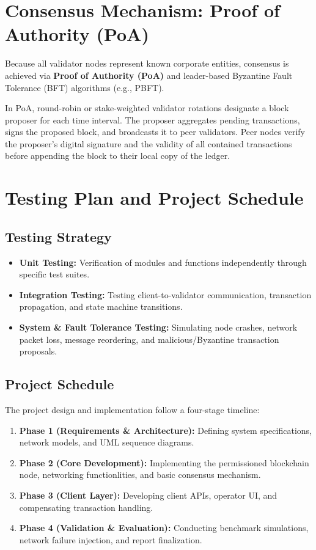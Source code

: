 \documentclass[11pt, a4paper, oneside]{memoir}
\begin{document}
\section{Consensus Mechanism: Proof of Authority (PoA)}
Because all validator nodes represent known corporate entities, consensus is achieved via \textbf{Proof of Authority (PoA)} and leader-based Byzantine Fault Tolerance (BFT) algorithms (e.g., PBFT). 

In PoA, round-robin or stake-weighted validator rotations designate a block proposer for each time interval. The proposer aggregates pending transactions, signs the proposed block, and broadcasts it to peer validators. Peer nodes verify the proposer's digital signature and the validity of all contained transactions before appending the block to their local copy of the ledger.

\section{Testing Plan and Project Schedule}
\subsection{Testing Strategy}
\begin{itemize}
    \item \textbf{Unit Testing:} Verification of modules and functions independently through specific test suites. 
    \item \textbf{Integration Testing:} Testing client-to-validator communication, transaction propagation, and state machine transitions.
    \item \textbf{System \& Fault Tolerance Testing:} Simulating node crashes, network packet loss, message reordering, and malicious/Byzantine transaction proposals.
\end{itemize}

\subsection{Project Schedule}
The project design and implementation follow a four-stage timeline:
\begin{enumerate}
    \item \textbf{Phase 1 (Requirements \& Architecture):} Defining system specifications, network models, and UML sequence diagrams.
    \item \textbf{Phase 2 (Core Development):} Implementing the permissioned blockchain node, networking functionlities, and basic consensus mechanism.
    \item \textbf{Phase 3 (Client Layer):} Developing client APIs, operator UI, and compensating transaction handling.
    \item \textbf{Phase 4 (Validation \& Evaluation):} Conducting benchmark simulations, network failure injection, and report finalization.
\end{enumerate}
\end{document}
